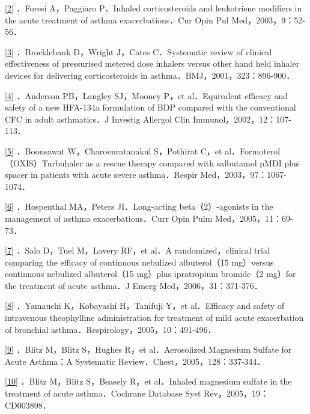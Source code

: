 \protect\hyperlink{text00013.htmlux5cux23ch2-12-back}{{[}2{]}} ．Foresi
A，Paggiaro P．Inhaled corticosteroids and leukotriene modifiers in the
acute treatment of asthma exacerbations．Cur Opin Pul
Med，2003，9：52-56．

\protect\hyperlink{text00013.htmlux5cux23ch3-12-back}{{[}3{]}}
．Brocklebank D，Wright J，Cates C．Systematic review of clinical
effectiveness of pressurised metered dose inhalers versus other hand
held inhaler devices for delivering corticosteroids in
asthma．BMJ，2001，323：896-900．

\protect\hyperlink{text00013.htmlux5cux23ch4-12-back}{{[}4{]}}
．Anderson PB，Langley SJ，Mooney P，et al．Equivalent efficacy and
safety of a new HFA-134a formulation of BDP compared with the
conventional CFC in adult asthmatics．J Investig Allergol Clin
Immunol，2002，12：107-113．

\protect\hyperlink{text00013.htmlux5cux23ch5-12-back}{{[}5{]}}
．Boonsawat W，Charoenratanakul S，Pothirat C，et
al．Formoterol（OXIS）Turbuhaler as a rescue therapy compared with
salbutamol pMDI plus spacer in patients with acute severe asthma．Respir
Med，2003，97：1067-1074．

\protect\hyperlink{text00013.htmlux5cux23ch6-12-back}{{[}6{]}}
．Hospenthal MA，Peters JI．Long-acting beta（2）-agonists in the
management of asthma exacerbations．Curr Opin Pulm
Med，2005，11：69-73．

\protect\hyperlink{text00013.htmlux5cux23ch7-12-back}{{[}7{]}} ．Salo
D，Tuel M，Lavery RF，et al．A randomized，clinical trial comparing the
efficacy of continuous nebulized albuterol（15 mg）versus continuous
nebulized albuterol（15 mg）plus ipratropium bromide（2 mg）for the
treatment of acute asthma．J Emerg Med，2006，31：371-376．

\protect\hyperlink{text00013.htmlux5cux23ch8-12-back}{{[}8{]}}
．Yamauchi K，Kobayashi H，Tanifuji Y，et al．Efficacy and safety of
intravenous theophylline administration for treatment of mild acute
exacerbation of bronchial asthma．Respirology，2005，10：491-496．

\protect\hyperlink{text00013.htmlux5cux23ch9-12-back}{{[}9{]}} ．Blitz
M，Blitz S，Hughes R，et al．Aerosolized Magnesium Sulfate for Acute
Asthma：A Systematic Review．Chest，2005，128：337-344．

\protect\hyperlink{text00013.htmlux5cux23ch10-12-back}{{[}10{]}} ．Blitz
M，Blitz S，Beasely R，et al．Inhaled magnesium sulfate in the treatment
of acute asthma．Cochrane Database Syst Rev，2005，19：CD003898．

